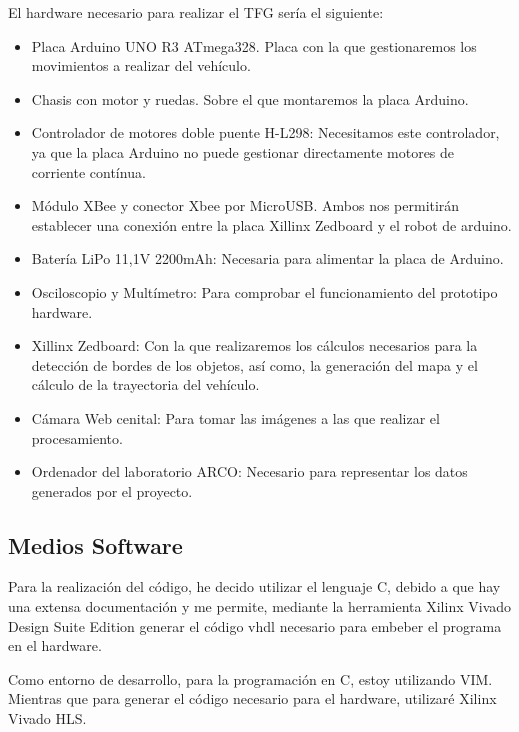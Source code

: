 \documentclass{pre-tfg}
\begin{document}
El hardware necesario para realizar el TFG sería el siguiente:

\begin{itemize}
\item Placa Arduino UNO R3 ATmega328. Placa con la que gestionaremos los movimientos a realizar del vehículo.
\item Chasis con motor y ruedas. Sobre el que montaremos la placa Arduino.
\item Controlador de motores doble puente H-L298: Necesitamos este controlador, ya que la placa Arduino no puede gestionar directamente motores de corriente contínua.
\item Módulo XBee y conector Xbee por MicroUSB. Ambos nos permitirán establecer una conexión entre la placa Xillinx Zedboard y el robot de arduino.
\item Batería LiPo 11,1V 2200mAh: Necesaria para alimentar la placa de Arduino.
\item Osciloscopio y Multímetro: Para comprobar el funcionamiento del prototipo hardware.
\item Xillinx Zedboard: Con la que realizaremos los cálculos necesarios para la detección de bordes de los objetos, así como, la generación del mapa y el cálculo de la trayectoria del vehículo.
\item Cámara Web cenital: Para tomar las imágenes a las que realizar el procesamiento.
\item Ordenador del laboratorio ARCO: Necesario para representar los datos generados por el proyecto.
\end{itemize}


\subsection{Medios Software}


Para la realización del código, he decido utilizar el lenguaje C, debido a que hay una extensa documentación y me permite, mediante la herramienta Xilinx Vivado Design Suite Edition generar el código vhdl necesario para embeber el programa en el hardware.

Como entorno de desarrollo, para la programación en C, estoy utilizando VIM. Mientras que para generar el código necesario para el hardware, utilizaré Xilinx Vivado HLS.
\end{document}

